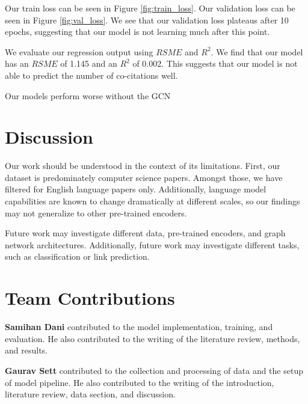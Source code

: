 \documentclass[10pt,twocolumn,letterpaper]{article}
\begin{document}
Our train loss can be seen in Figure \ref{fig:train_loss}. Our validation loss can be seen in Figure \ref{fig:val_loss}. We see that our validation loss plateaus after 10 epochs, suggesting that our model is not learning much after this point.

We evaluate our regression output using $RSME$ and $R^2$. We find that our model has an $RSME$ of 1.145 and an $R^2$ of 0.002. This suggests that our model is not able to predict the number of co-citations well. 

Our models perform worse without the GCN 

\section{Discussion}


Our work should be understood in the context of its limitations. First, our dataset is predominately computer science papers. Amongst those, we have filtered for English language papers only. Additionally, language model capabilities are known to change dramatically at different scales, so our findings may not generalize to other pre-trained encoders.

Future work may investigate different data, pre-trained encoders, and graph network architectures. Additionally, future work may investigate different tasks, such as classification or link prediction.

\section*{Team Contributions}

\textbf{Samihan Dani} contributed to the model implementation, training, and evaluation. He also contributed to the writing of the literature review, methods, and results.

\textbf{Gaurav Sett} contributed to the collection and processing of data and the setup of model pipeline. He also contributed to the writing of the introduction, literature review, data section, and discussion.


{\small


}
\end{document}

